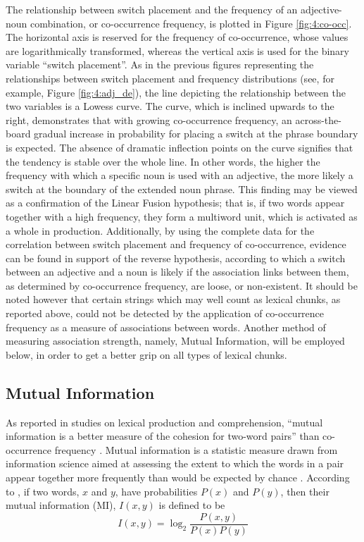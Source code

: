 The relationship between switch placement and the frequency of an adjective-noun combination, or co-occurrence frequency, is plotted in Figure \ref{fig:4:co-occ}. The horizontal axis is reserved for the frequency of co-occurrence, whose values are logarithmically transformed, whereas the vertical axis is used for the binary variable “switch placement”. As in the previous figures representing the relationships between switch placement and frequency distributions (see, for example, Figure \ref{fig:4:adj_de}), the line depicting the relationship between the two variables is a Lowess curve. The curve, which is inclined upwards to the right, demonstrates that with growing co-occurrence frequency, an across-the-board gradual increase in probability for placing a switch at the phrase boundary is expected. The absence of dramatic inflection points on the curve signifies that the tendency is stable over the whole line. In other words, the higher the frequency with which a specific noun is used with an adjective, the more likely a switch at the boundary of the extended noun phrase. This finding may be viewed as a confirmation of the Linear Fusion hypothesis; that is, if two words appear together with a high frequency, they form a multiword unit, which is activated as a whole in production. Additionally, by using the complete data for the correlation between switch placement and frequency of co-occurrence, evidence can be found in support of the reverse hypothesis, according to which a switch between an adjective and a noun is likely if the association links between them, as determined by co-occurrence frequency, are loose, or non-existent. It should be noted however that certain strings which may well count as lexical chunks, as reported above, could not be detected by the application of co-occurrence frequency as a measure of associations between words. Another method of measuring association strength, namely, Mutual Information, will be employed below, in order to get a better grip on all types of lexical chunks.

\subsection{Mutual Information}

As reported in studies on lexical production and comprehension, ``mutual information is a better measure of the cohesion for two-word pairs'' \citep{gregory-etal-1999} than co-occurrence frequency \citep[cf.][]{ellis-formulaic-2008}. Mutual information is a statistic measure drawn from information science aimed at assessing the extent to which the words in a pair appear together more frequently than would be expected by chance \citep{oakes-1998, manning-schuetze-1999, wiechmann-2008}. According to \citet{fano-1961}, if two words, $x$ and $y$, have probabilities $P(x)$ and $P(y)$, then their mutual information (MI), $I(x,y)$ is defined to be \[ I(x, y) = \log_2 \frac{P(x,y)}{P(x)P(y)} \]


